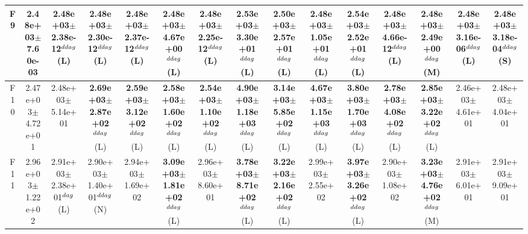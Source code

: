 \begin{table}[!t]
\begin{tabular}{c|cccccccccccccc}
F9  & 2.48e+03$\pm$7.60e-03  & 2.48e+03$\pm$2.38e-12$^{\\ddag}$ (L)  & 2.48e+03$\pm$2.30e-12$^{\\ddag}$ (L)  & 2.48e+03$\pm$2.37e-12$^{\\ddag}$ (L)  & \textbf{2.48e+03$\pm$4.67e+00}$^{\\ddag}$ (L)  & 2.48e+03$\pm$2.25e-12$^{\\ddag}$ (L)  & \textbf{2.53e+03$\pm$3.30e+01}$^{\\ddag}$ (L)  & \textbf{2.50e+03$\pm$2.57e+01}$^{\\ddag}$ (L)  & \textbf{2.48e+03$\pm$1.05e+01}$^{\\ddag}$ (L)  & \textbf{2.54e+03$\pm$2.52e+01}$^{\\ddag}$ (L)  & 2.48e+03$\pm$4.66e-12$^{\\ddag}$ (L)  & \textbf{2.48e+03$\pm$2.49e+00}$^{\\ddag}$ (M)  & 2.48e+03$\pm$3.16e-06$^{\\ddag}$ (L)  & 2.48e+03$\pm$3.18e-04$^{\\ddag}$ (S) \\ \hline
F10  & 2.47e+03$\pm$4.72e+01  & 2.48e+03$\pm$5.14e+01   & \textbf{2.69e+03$\pm$2.87e+02}$^{\\ddag}$ (L)  & \textbf{2.59e+03$\pm$3.12e+02}$^{\\ddag}$ (L)  & \textbf{2.58e+03$\pm$1.60e+02}$^{\\ddag}$ (L)  & \textbf{2.54e+03$\pm$1.10e+02}$^{\\ddag}$ (L)  & \textbf{4.90e+03$\pm$1.18e+03}$^{\\ddag}$ (L)  & \textbf{3.14e+03$\pm$5.85e+02}$^{\\ddag}$ (L)  & \textbf{4.67e+03$\pm$1.15e+03}$^{\\ddag}$ (L)  & \textbf{3.80e+03$\pm$1.70e+03}$^{\\ddag}$ (L)  & \textbf{2.78e+03$\pm$4.08e+02}$^{\\ddag}$ (L)  & \textbf{2.85e+03$\pm$3.22e+02}$^{\\ddag}$ (L)  & 2.46e+03$\pm$4.61e+01   & 2.48e+03$\pm$4.04e+01  \\ \hline
F11  & 2.96e+03$\pm$1.22e+02  & 2.91e+03$\pm$2.38e+01$^{\\dag}$ (L)  & 2.90e+03$\pm$1.40e+01$^{\\ddag}$ (N)  & 2.94e+03$\pm$1.69e+02   & \textbf{3.09e+03$\pm$1.81e+02}$^{\\ddag}$ (L)  & 2.96e+03$\pm$8.60e+01   & \textbf{3.78e+03$\pm$8.71e+02}$^{\\ddag}$ (L)  & \textbf{3.22e+03$\pm$2.16e+02}$^{\\ddag}$ (L)  & 2.99e+03$\pm$2.55e+02   & \textbf{3.97e+03$\pm$3.26e+02}$^{\\ddag}$ (L)  & 2.90e+03$\pm$1.08e+02   & \textbf{3.23e+03$\pm$4.76e+02}$^{\\ddag}$ (M)  & 2.91e+03$\pm$6.01e+01   & 2.91e+03$\pm$9.09e+01  \\ \hline

\end{tabular}
\end{table}
